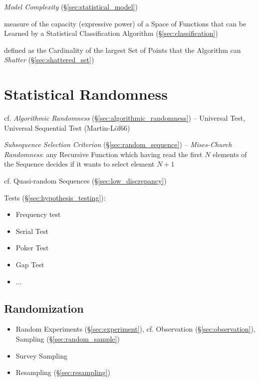 \emph{Model Complexity} (\S\ref{sec:statistical_model})

measure of the capacity (expressive power) of a Space of Functions that can be
Learned by a Statistical Classification Algorithm (\S\ref{sec:classification})

defined as the Cardinality of the largest Set of Points that the Algorithm can
\emph{Shatter} (\S\ref{sec:shattered_set})



\section{Statistical Randomness}\label{sec:statistical_randomness}

cf. \emph{Algorithmic Randomness} (\S\ref{sec:algorithmic_randomness}) --
Universal Test, Universal Sequential Test (Martin-L\"of66)

\emph{Subsequence Selection Criterion} (\S\ref{sec:random_sequence}) --
\emph{Mises-Church Randomness}: any Recursive Function which having read the
first $N$ elements of the Sequence decides if it wants to select element $N+1$

cf. Quasi-random Sequences (\S\ref{sec:low_discrepancy})

Tests (\S\ref{sec:hypothesis_testing}):
\begin{itemize}
  \item Frequency test
  \item Serial Test
  \item Poker Test
  \item Gap Test
  \item ...
\end{itemize}



\subsection{Randomization}\label{sec:randomization}

\begin{itemize}
  \item Random Experiments (\S\ref{sec:experiment}), cf. Observation
    (\S\ref{sec:observation}), Sampling (\S\ref{sec:random_sample})
  \item Survey Sampling
  \item Resampling (\S\ref{sec:resampling})
\end{itemize}



